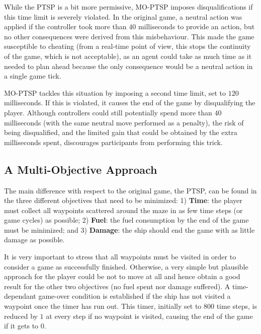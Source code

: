 \documentclass[conference]{IEEEtran}
\begin{document}
While the PTSP is a bit more permissive, MO-PTSP imposes disqualifications if this time limit is severely violated. In the original game, a neutral action was applied if the controller took more than $40$ milliseconds to provide an action, but no other consequences were derived from this misbehaviour. This made the game susceptible to cheating (from a real-time point of view, this stops the continuity of the game, which is not acceptable), as an agent could take as much time as it needed to plan ahead because the only consequence would be a neutral action in a single game tick.  

MO-PTSP tackles this situation by imposing a second time limit, set to $120$ milliseconds. If this is violated, it causes the end of the game by disqualifying the player. Although controllers could still potentially spend more than $40$ milliseconds (with the same neutral move performed as a penalty), the risk of being disqualified, and the limited gain that could be obtained by the extra milliseconds spent, discourages participants from performing this trick.

\subsection{A Multi-Objective Approach}

The main difference with respect to the original game, the PTSP, can be found in the three different objectives that need to be minimized: 1) \textbf{Time}: the player must collect all waypoints scattered around the maze in as few time steps (or game cycles) as possible; 2) \textbf{Fuel}: the fuel consumption by the end of the game must be minimized; and 3) \textbf{Damage}: the ship should end the game with as little damage as possible.

It is very important to stress that all waypoints must be visited in order to consider a game as successfully finished. Otherwise, a very simple but plausible approach for the player could be not to move at all and hence obtain a good result for the other two objectives (no fuel spent nor damage suffered). A time-dependant game-over condition is established if the ship has not visited a waypoint once the timer has run out. This timer, initially set to $800$ time steps, is reduced by $1$ at every step if no waypoint is visited, causing the end of the game if it gets to $0$.%
\end{document}
